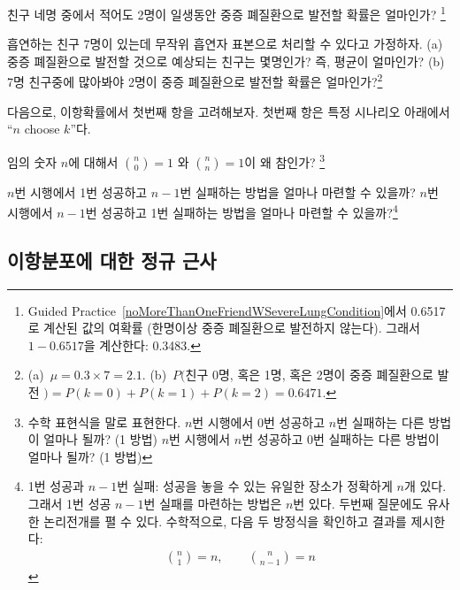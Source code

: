 \begin{exercise}
친구 네명 중에서 적어도 2명이 일생동안 중증 폐질환으로 발전할 확률은 얼마인가?
\footnote{Guided Practice~\ref{noMoreThanOneFriendWSevereLungCondition}에서 0.6517로 계산된 값의 여확률 (한명이상 중증 폐질환으로 발전하지 않는다). 그래서 $1 - 0.6517$을 계산한다: 0.3483.}
\end{exercise}

\begin{exercise}
흡연하는 친구 7명이 있는데 무작위 흡연자 표본으로 처리할 수 있다고 가정하자. (a) 중증 폐질환으로 발전할 것으로 예상되는 친구는 몇명인가? 즉, 평균이 얼마인가? (b) 7명 친구중에 많아봐야 2명이 중증 폐질환으로 발전할 확률은 얼마인가?\footnote{(a)~$\mu=0.3\times7 = 2.1$. (b)~$P($친구 0명, 혹은  1명, 혹은 2명이 중증 폐질환으로 발전 $) = P(k=0) + P(k=1)+P(k=2) = 0.6471$.}
\end{exercise}

다음으로, 이항확률에서 첫번째 항을 고려해보자. 첫번째 항은 특정 시나리오 아래에서 ``$n$ choose $k$''다.

\begin{exercise}
임의 숫자 $n$에 대해서 ${n \choose 0}=1$ 와 ${n \choose n}=1$이 왜 참인가?
\footnote{수학 표현식을 말로 표현한다. $n$번 시행에서 0번 성공하고 $n$번 실패하는 다른 방법이 얼마나 될까? (1 방법) $n$번 시행에서 $n$번 성공하고 0번 실패하는 다른 방법이 얼마나 될까? (1 방법) }
\end{exercise}

\begin{exercise}
$n$번 시행에서 1번 성공하고 $n-1$번 실패하는 방법을 얼마나 마련할 수 있을까? $n$번 시행에서 $n-1$번 성공하고 1번 실패하는 방법을 얼마나 마련할 수 있을까?\footnote{1번 성공과 $n-1$번 실패: 
성공을 놓을 수 있는 유일한 장소가 정확하게 $n$개 있다. 그래서 1번 성공 $n-1$번 실패를 마련하는 방법은 $n$번 있다. 두번째 질문에도 유사한 논리전개를 펼 수 있다. 수학적으로, 다음 두 방정식을 확인하고 결과를 제시한다:
\begin{eqnarray*}
{n \choose 1} = n, \qquad {n \choose n-1} = n
\end{eqnarray*}}
\end{exercise}



\subsection{이항분포에 대한 정규 근사}


